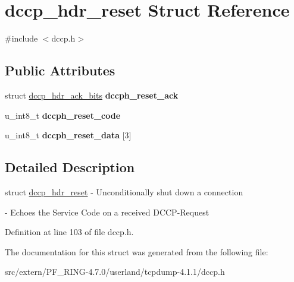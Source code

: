 \hypertarget{structdccp__hdr__reset}{
\section{dccp\_\-hdr\_\-reset Struct Reference}
\label{structdccp__hdr__reset}
}


{\ttfamily \#include $<$dccp.h$>$}

\subsection*{Public Attributes}
\begin{DoxyCompactItemize}
\item 
\hypertarget{structdccp__hdr__reset_a833decc84498ca66e643fafb9c6ee633}{
struct \hyperlink{structdccp__hdr__ack__bits}{dccp\_\-hdr\_\-ack\_\-bits} {\bfseries dccph\_\-reset\_\-ack}}
\label{structdccp__hdr__reset_a833decc84498ca66e643fafb9c6ee633}

\item 
\hypertarget{structdccp__hdr__reset_a6542ace5e17a986ca06b2017ac0145fb}{
u\_\-int8\_\-t {\bfseries dccph\_\-reset\_\-code}}
\label{structdccp__hdr__reset_a6542ace5e17a986ca06b2017ac0145fb}

\item 
\hypertarget{structdccp__hdr__reset_a69ce39b48fa15829ce481d66163fa2f1}{
u\_\-int8\_\-t {\bfseries dccph\_\-reset\_\-data} \mbox{[}3\mbox{]}}
\label{structdccp__hdr__reset_a69ce39b48fa15829ce481d66163fa2f1}

\end{DoxyCompactItemize}


\subsection{Detailed Description}
struct \hyperlink{structdccp__hdr__reset}{dccp\_\-hdr\_\-reset} -\/ Unconditionally shut down a connection

-\/ Echoes the Service Code on a received DCCP-\/Request 

Definition at line 103 of file dccp.h.



The documentation for this struct was generated from the following file:\begin{DoxyCompactItemize}
\item 
src/extern/PF\_\-RING-\/4.7.0/userland/tcpdump-\/4.1.1/dccp.h\end{DoxyCompactItemize}
